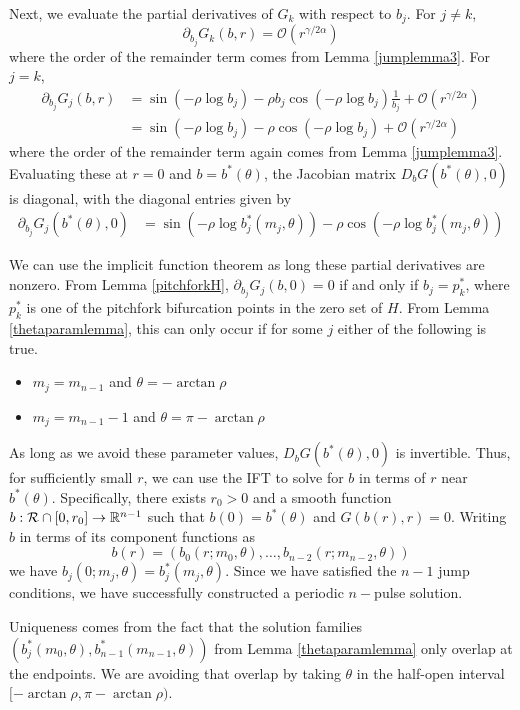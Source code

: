\documentclass[thesis.tex]{subfiles}
\begin{document}
Next, we evaluate the partial derivatives of $G_k$ with respect to $b_j$. For $j \neq k$, 
\[
\partial_{b_j} G_k(b, r) = \mathcal{O}(r^{\gamma/2\alpha})
\]
where the order of the remainder term comes from Lemma \ref{jumplemma3}. For $j = k$, 
\begin{align*}
\partial_{b_j} G_j(b, r) &= 
\sin \left( -\rho \log b_j \right) - \rho b_j \cos \left( -\rho \log b_j \right) \frac{1}{b_j} + \mathcal{O}(r^{\gamma/2\alpha}) \\
&= \sin \left( -\rho \log b_j \right) - \rho \cos \left( -\rho \log b_j \right) + \mathcal{O}(r^{\gamma/2\alpha}) 
\end{align*}
where the order of the remainder term again comes from Lemma \eqref{jumplemma3}. Evaluating these at $r = 0$ and $b = b^*(\theta)$, the Jacobian matrix $D_b G(b^*(\theta),0)$ is diagonal, with the diagonal entries given by 
\begin{align*}
\partial_{b_j} G_j(b^*(\theta), 0)
&= \sin \left( -\rho \log b_j^*(m_j, \theta) \right) - \rho \cos \left( -\rho \log b_j^*(m_j, \theta) \right)
\end{align*}

We can use the implicit function theorem as long these partial derivatives are nonzero. From Lemma \ref{pitchforkH}, $\partial_{b_j} G_j(b, 0) = 0$ if and only if $b_j = p_k^*$, where $p_k^*$ is one of the pitchfork bifurcation points in the zero set of $H$. From Lemma \ref{thetaparamlemma}, this can only occur if for some $j$ either of the following is true.
\begin{itemize}
\item $m_j = m_{n-1}$ and $\theta = -\arctan \rho$
\item $m_j = m_{n-1} - 1$ and $\theta = \pi-\arctan \rho$
\end{itemize}

As long as we avoid these parameter values, $D_b G(b^*(\theta), 0)$ is invertible. Thus, for sufficiently small $r$, we can use the IFT to solve for $b$ in terms of $r$ near $b^*(\theta)$. Specifically, there exists $r_0 > 0$ and a smooth function $b: \mathcal{R} \cap [0, r_0] \rightarrow {\mathbb R}^{n-1}$ such that $b(0) = b^*(\theta)$ and $G(b(r),r) = 0$. Writing $b$ in terms of its component functions as
\[
b(r) = \left( b_0(r; m_0, \theta), \dots, b_{n-2}(r; m_{n-2}, \theta) \right)
\]
we have $b_j(0; m_j, \theta) = b_j^*(m_j, \theta)$. Since we have satisfied the $n-1$ jump conditions, we have successfully constructed a periodic $n-$pulse solution. 

Uniqueness comes from the fact that the solution families $(b_j^*(m_0, \theta), b_{n-1}^*(m_{n-1}, \theta))$ from Lemma \eqref{thetaparamlemma} only overlap at the endpoints. We are avoiding that overlap by taking $\theta$ in the half-open interval $[-\arctan \rho, \pi - \arctan \rho)$. 
\end{document}
